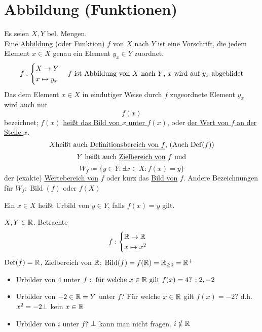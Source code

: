 \documentclass{gadsescript}
\begin{document}
\section{Abbildung (Funktionen)}

\begin{definition}
	Es seien $ X, Y $ bel. Mengen.\\
	Eine \underline{Abbildung} (oder Funktion) $ f $ von $ X $ nach $ Y $ ist eine Vorschrift, die jedem Element $ x \in X $ genau ein Element $ y_x \in Y $ zuordnet.
	\[ f :
		\begin{cases}
			X \to Y\\
			x \mapsto y_x
		\end{cases}
		f \text{ ist Abbildung von $ X $ nach $ Y $, $ x $ wird auf $ y_x $ abgeblidet}
	\]
	Das dem Element $ x \in X $ in eindutiger Weise durch $ f $ zugeordnete Element $ y_x $ wird auch mit \[ f(x) \] bezeichnet; $ f(x) $ \underline{heißt das Bild von $ x $ unter $ f(x) $}, oder \underline{der Wert von $ f $ an der Stelle $ x $}.
	\[ X \text{heißt auch \underline{Definitionsbereich von $ f $}, (Auch $ \operatorname{Def}(f) $)} \]
	\[ Y \text{ heißt auch \underline{Zielbereich von} $ f $ und} \]
	\[ W_f \coloneqq \{ y \in Y : \exists x \in X : f(x) = y \} \]
	der (exakte) \underline{Wertebereich von} $ f $ oder kurz das \underline{Bild von} $ f $. Andere Bezeichnungen für $ W_f : \operatorname{Bild}(f) \text{ oder } f(X) $\par
	\begin{definition}
		Ein $ x \in X $ heißt Urbild von $ y \in Y $, falls $ f(x) = y $ gilt.
		\begin{example}
			$ X, Y \in \mathbb{R} $. Betrachte \[ f: \begin{cases} \mathbb{R} \to \mathbb{R}\\ x \mapsto x^2 \end{cases} \] $ \operatorname{Def}(f) = \mathbb{R} $, Zielbereich von $ \mathbb{R} $; $ \operatorname{Bild}(f) = f(\mathbb{R}) = \mathbb{R}_{\geq 0} = \mathbb{R}^{+} $
		\end{example}
		\begin{example}
			\begin{itemize}
				\item Urbilder von $ 4 $ unter $ f : \text{ für welche $ x \in \mathbb{R} $ gilt $f(x) = 4 $? $ : 2, -2 $} $
				\item Urbilder von $ -2 \in \mathbb{R} = Y $ unter $ f $? Für welche $ x \in \mathbb{R} $ gilt $ f(x) = -2 $? d.h. $ x^2 = -2 \bot $ kein $ x \in \mathbb{R} $
				\item Urbilder von $ i $ unter $ f $? $ \bot $ kann man nicht fragen. $ i \notin \mathbb{R} $
			\end{itemize}
		\end{example}
	\end{definition}
\end{definition}
\end{document}
